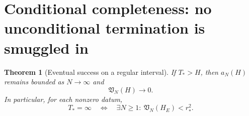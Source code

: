\documentclass[11pt,a4paper]{article}
\newtheorem{theorem}{Theorem}[section]
\theoremstyle{definition}\newtheorem{definition}[theorem]{Definition}
\theoremstyle{remark}\newtheorem{remark}[theorem]{Remark}
\newcommand{\rstar}{r_*}
\numberwithin{equation}{section}
\begin{document}
\section{Conditional completeness: no unconditional termination is smuggled in}
\label{sec:complete}
\begin{theorem}[Eventual success on a regular interval]\label{thm:complete}
If $T_*>H$, then $a_N(H)$ remains bounded as $N\to\infty$ and
\begin{equation}\label{eq:Vzero}
 \mathfrak V_N(H)\longrightarrow0.
\end{equation}
In particular, for each nonzero datum,
\begin{equation}\label{eq:equivalence}
 T_*=\infty
 \quad\Longleftrightarrow\quad
 \exists N\ge1:\ \mathfrak V_N(H_E)<\rstar^2.
\end{equation}
\end{theorem}
\end{document}
